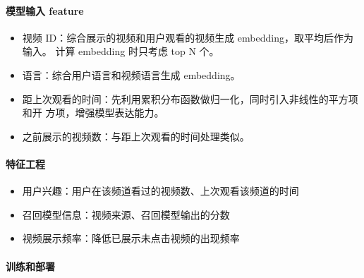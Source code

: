 \paragraph{模型输入 feature}
\begin{itemize}
  \item 视频 ID：综合展示的视频和用户观看的视频生成 embedding，取平均后作为输入。
    计算 embedding 时只考虑 top N 个。
  \item 语言：综合用户语言和视频语言生成 embedding。
  \item 距上次观看的时间：先利用累积分布函数做归一化，同时引入非线性的平方项和开
    方项，增强模型表达能力。
  \item 之前展示的视频数：与距上次观看的时间处理类似。
\end{itemize}

\paragraph{特征工程}
\begin{itemize}
  \item 用户兴趣：用户在该频道看过的视频数、上次观看该频道的时间
  \item 召回模型信息：视频来源、召回模型输出的分数
  \item 视频展示频率：降低已展示未点击视频的出现频率
\end{itemize}

\paragraph{训练和部署}

